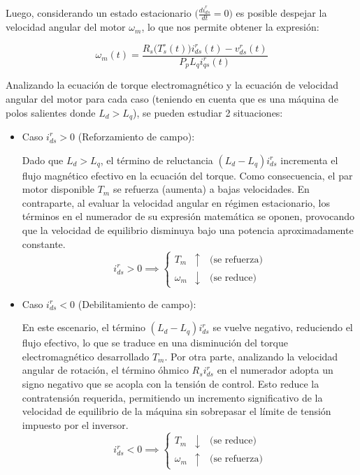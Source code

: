 \documentclass[blue,fullpaper]{ludusofficial}  %
\begin{document}
Luego, considerando un estado estacionario $\Big(\frac{di_{ds}^r}{dt}=0 \Big)$ es posible despejar la velocidad angular del motor $\omega_m$, lo que nos permite obtener la expresión:

\begin{equation}
\label{eq:velocidad-equilibrio}
\omega_{m}(t) = \frac{R_{s} \Big( T_{s}^{\circ} (t) \Big) i_{ds}^{r}(t) - v_{ds}^{r}(t)}{P_{p} L_{q} i_{qs}^{r}(t)}
\end{equation}

Analizando la ecuación de torque electromagnético y la ecuación de velocidad angular del motor para cada caso (teniendo en cuenta que es una máquina de polos salientes donde $L_d>L_q$), se pueden estudiar 2 situaciones:
\begin{itemize}
    \item Caso $i^r_{ds}>0$ (Reforzamiento de campo):
    
    Dado que $L_d > L_q$, el término de reluctancia $(L_d - L_q)i_{ds}^r$ incrementa el flujo magnético efectivo en la ecuación del torque. Como consecuencia, el par motor disponible $T_m$ se refuerza (aumenta) a bajas velocidades. En contraparte, al evaluar la velocidad angular en régimen estacionario, los términos en el numerador de su expresión matemática se oponen, provocando que la velocidad de equilibrio disminuya bajo una potencia aproximadamente constante.
    \[
    i_{ds}^{r} > 0 \implies \left\{ 
    \begin{aligned}
    T_{m} &\uparrow \quad \text{(se refuerza)} \\
    \omega_{m} &\downarrow \quad \text{(se reduce)}
    \end{aligned}
    \right.
    \]

    \item Caso $i^r_{ds}<0$ (Debilitamiento de campo):
    
    En este escenario, el término $(L_d - L_q)i_{ds}^r$ se vuelve negativo, reduciendo el flujo efectivo, lo que se traduce en una disminución del torque electromagnético desarrollado $T_m$. Por otra parte, analizando la velocidad angular de rotación, el término óhmico $R_s i_{ds}^r$ en el numerador adopta un signo negativo que se acopla con la tensión de control. Esto reduce la contratensión requerida, permitiendo un incremento significativo de la velocidad de equilibrio de la máquina sin sobrepasar el límite de tensión impuesto por el inversor.   
    \[
    i_{ds}^{r} < 0 \implies \left\{ 
    \begin{aligned}
    T_{m} &\downarrow \quad \text{(se reduce)} \\
    \omega_{m} &\uparrow \quad \text{(se refuerza)}
    \end{aligned}
    \right.
    \]
\end{itemize}
\end{document}
